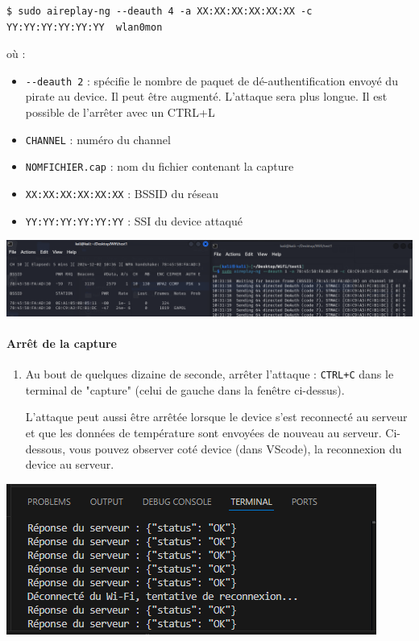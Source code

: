 \documentclass[french, 12pt]{article}%
\newcommand{\itemE}{\item[$\bullet$]}
\begin{document}
\begin{lstlisting}[style=commande]
$ sudo aireplay-ng --deauth 4 -a XX:XX:XX:XX:XX:XX -c YY:YY:YY:YY:YY:YY  wlan0mon
\end{lstlisting}
où : 
\begin{itemize}
\itemE \verb?--deauth 2? : spécifie le nombre de paquet de dé-authentification envoyé du pirate au device. Il peut être augmenté. L'attaque sera plus longue. Il est possible de l'arrêter avec un CTRL+L
\itemE \verb?CHANNEL? : numéro du channel 
\itemE \verb?NOMFICHIER.cap? : nom du fichier contenant la capture
\itemE \verb?XX:XX:XX:XX:XX:XX? : BSSID du réseau 
\itemE \verb?YY:YY:YY:YY:YY:YY? : SSI du device attaqué
\end{itemize}

\begin{center}
\includegraphics[scale=0.4]{./ressource/screenAttaque}
\end{center}


\paragraph{Arrêt de la capture}
\begin{enumerate}[resume]
\item Au bout de quelques dizaine de seconde, arrêter l'attaque : \verb?CTRL+C? dans le terminal de "capture" (celui de gauche dans la fenêtre ci-dessus). 

L'attaque peut aussi être arrêtée lorsque le device s'est reconnecté au serveur et que les données de température sont envoyées de nouveau au serveur. Ci-dessous, vous pouvez observer coté device (dans VScode), la reconnexion du device au serveur.
\end{enumerate}

\begin{center}
\includegraphics[scale=0.7]{./ressource/moniteurVS}
\end{center}
\end{document}
